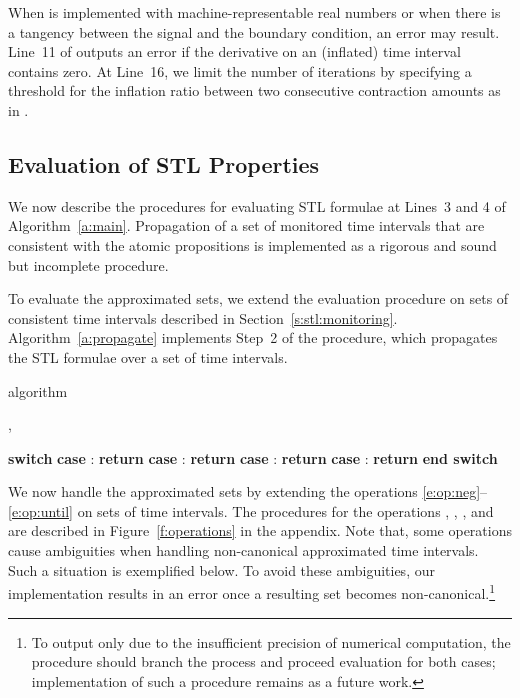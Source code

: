 \documentclass[paper]{ieice}
\begin{document}
When  is implemented with machine-representable real numbers or when there is a tangency between the signal and the boundary condition, an error may result.
Line~11 of  outputs an error if the derivative on an (inflated) time interval contains zero.
At Line~16, we limit the number of iterations by specifying a threshold  for the inflation ratio between two consecutive contraction amounts as in \cite{Goldztejn2010:RC}.




\subsection{Evaluation of STL Properties}
\label{s:method:propag}

We now describe the procedures for evaluating STL formulae at Lines~3 and 4 of Algorithm~\ref{a:main}.
Propagation of a set of monitored time intervals that are consistent with the atomic propositions is implemented as a rigorous and sound but incomplete procedure.

To evaluate the approximated sets, we extend the evaluation procedure on sets of consistent time intervals described in Section~\ref{s:stl:monitoring}.
Algorithm~\ref{a:propagate} implements Step~2 of the procedure, which propagates the STL formulae over a set of time intervals.

\begin{algorithm}[t]
\caption{ algorithm}
\label{a:propagate}

\begin{algorithmic}[1]
  \REQUIRE , 
  \ENSURE 

  \STATE \textbf{switch} 
  \STATE \textbf{case}  : 
  \STATE \qquad \textbf{return} {}
  \STATE \textbf{case}  : 
  \STATE \qquad \textbf{return} 
  \STATE \textbf{case}  : 
  \STATE \qquad 
  \STATE \qquad 
  \STATE \qquad \textbf{return} {}
  \STATE \textbf{case}  : 
  \STATE \qquad 
  \STATE \qquad 
\STATE \qquad \textbf{return} 
  \STATE \textbf{end switch}
\end{algorithmic}
\end{algorithm}

We now handle the approximated sets by extending the operations \eqref{e:op:neg}--\eqref{e:op:until} on sets of time intervals.
The procedures for the operations , , , and  are described in Figure~\ref{f:operations} in the appendix.
Note that, some operations cause ambiguities when handling non-canonical approximated time intervals.
Such a situation is exemplified below.
To avoid these ambiguities, our implementation results in an error once a resulting set becomes non-canonical.\footnote{
To output  only due to the insufficient precision of numerical computation,
the procedure should branch the process and proceed evaluation for both cases;
implementation of such a procedure remains as a future work.}
\end{document}
